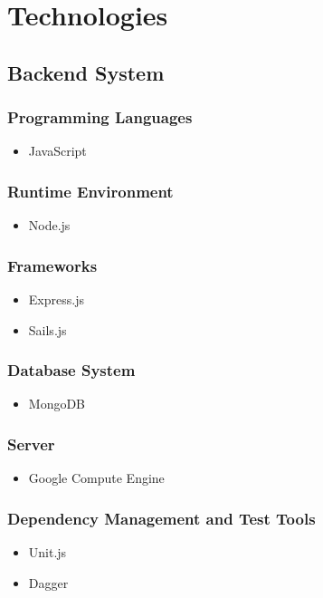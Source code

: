 \documentclass[11pt,fleqn]{book} %
\begin{document}
	
	\chapter{Technologies}
	
	\section{Backend System}
	\subsection{Programming Languages}
	\begin{itemize}
		\item JavaScript
	\end{itemize}
	\subsection{Runtime Environment}
	\begin{itemize}
		\item Node.js
	\end{itemize}
	\subsection{Frameworks}
	\begin{itemize}
		\item Express.js
		\item Sails.js
	\end{itemize}
	\subsection{Database System}
	\begin{itemize}
		\item MongoDB
	\end{itemize}
	\subsection{Server}
	\begin{itemize}
		\item Google Compute Engine
	\end{itemize}
	\subsection{Dependency Management and Test Tools}
	\begin{itemize}
		\item Unit.js
		\item Dagger
	\end{itemize}
\end{document}
